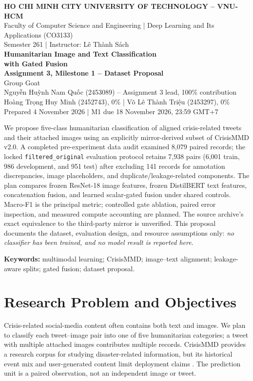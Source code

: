 \documentclass[11pt,a4paper]{article}
\newcommand{\primary}{\texttt{filtered\_original}}
\begin{document}
\begin{center}
{\footnotesize\bfseries HO CHI MINH CITY UNIVERSITY OF TECHNOLOGY -- VNU-HCM}\\[2pt]
{\footnotesize Faculty of Computer Science and Engineering \;|\; Deep Learning and Its Applications (CO3133)}\\[2pt]
{\footnotesize Semester 261 \;|\; Instructor: Lê Thành Sách}\\[13pt]
{\Large\bfseries Humanitarian Image and Text Classification\\[2pt]
with Gated Fusion}\\[7pt]
{\normalsize\bfseries Assignment 3, Milestone 1 -- Dataset Proposal}\\[5pt]
{\normalsize Group Goat}\\[3pt]
{\small Nguyễn Huỳnh Nam Quốc (2453089) -- Assignment 3 lead, 100\% contribution}\\[2pt]
{\small Hoàng Trọng Huy Minh (2452743), 0\% \;|\; Võ Lê Thành Triệu (2453297), 0\%}\\[3pt]
{\small Prepared 4 November 2026 \;|\; M1 due 18 November 2026, 23:59 GMT+7}
\end{center}
\vspace{5pt}
\;
We propose five-class humanitarian classification of aligned crisis-related tweets and their attached images using an explicitly mirror-derived subset of CrisisMMD v2.0. A completed pre-experiment data audit examined 8,079 paired records; the locked \primary{} evaluation protocol retains 7,938 pairs (6,001 train, 986 development, and 951 test) after excluding 141 records for annotation discrepancies, image placeholders, and duplicate/leakage-related components. The plan compares frozen ResNet-18 image features, frozen DistilBERT text features, concatenation fusion, and learned scalar-gated fusion under shared controls. Macro-F1 is the principal metric; controlled gate ablation, paired error inspection, and measured compute accounting are planned. The source archive's exact equivalence to the third-party mirror is unverified. This proposal documents the dataset, evaluation design, and resource assumptions only: \emph{no classifier has been trained, and no model result is reported here}.

{\footnotesize\textbf{Keywords:} multimodal learning; CrisisMMD; image--text alignment; leakage-aware splits; gated fusion; dataset proposal.}

\section{Research Problem and Objectives}
Crisis-related social-media content often contains both text and images. We plan to classify each tweet--image pair into one of five humanitarian categories; a tweet with multiple attached images contributes multiple records. CrisisMMD provides a research corpus for studying disaster-related information, but its historical event mix and user-generated content limit deployment claims \cite{alam2018,ofli2020}. The prediction unit is a paired observation, not an independent image or tweet.
\end{document}
